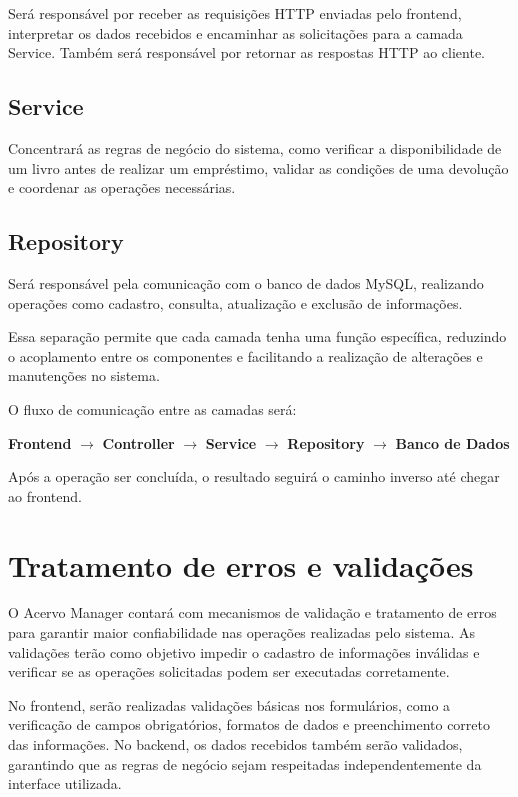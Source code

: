 \documentclass[12pt,a4paper]{article}
\begin{document}
Será responsável por receber as requisições HTTP enviadas pelo frontend, interpretar os dados recebidos e encaminhar as solicitações para a camada Service. Também será responsável por retornar as respostas HTTP ao cliente.

\subsection{Service}

Concentrará as regras de negócio do sistema, como verificar a disponibilidade de um livro antes de realizar um empréstimo, validar as condições de uma devolução e coordenar as operações necessárias.

\subsection{Repository}

Será responsável pela comunicação com o banco de dados MySQL, realizando operações como cadastro, consulta, atualização e exclusão de informações.

Essa separação permite que cada camada tenha uma função específica, reduzindo o acoplamento entre os componentes e facilitando a realização de alterações e manutenções no sistema.

O fluxo de comunicação entre as camadas será:

\begin{center}
\textbf{Frontend}
$\rightarrow$
\textbf{Controller}
$\rightarrow$
\textbf{Service}
$\rightarrow$
\textbf{Repository}
$\rightarrow$
\textbf{Banco de Dados}
\end{center}

Após a operação ser concluída, o resultado seguirá o caminho inverso até chegar ao frontend.

\section{Tratamento de erros e validações}

O Acervo Manager contará com mecanismos de validação e tratamento de erros para garantir maior confiabilidade nas operações realizadas pelo sistema. As validações terão como objetivo impedir o cadastro de informações inválidas e verificar se as operações solicitadas podem ser executadas corretamente.

No frontend, serão realizadas validações básicas nos formulários, como a verificação de campos obrigatórios, formatos de dados e preenchimento correto das informações. No backend, os dados recebidos também serão validados, garantindo que as regras de negócio sejam respeitadas independentemente da interface utilizada.
\end{document}
